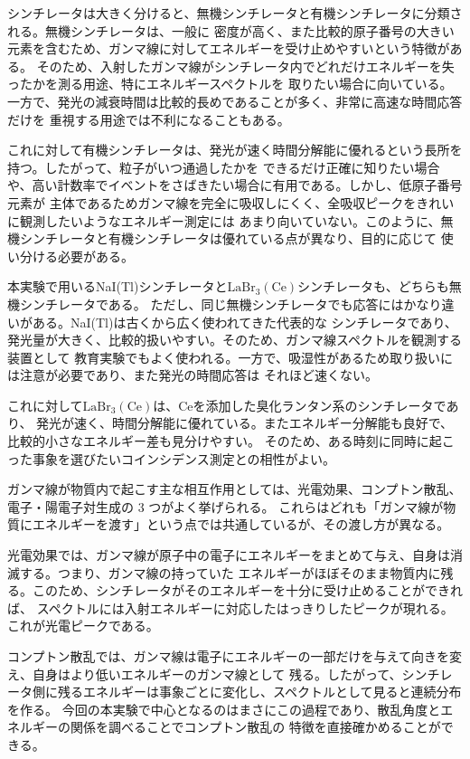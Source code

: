 \documentclass[uplatex,dvipdfmx,12pt,nomag]{jsarticle}
\begin{document}
シンチレータは大きく分けると、無機シンチレータと有機シンチレータに分類される。無機シンチレータは、一般に
密度が高く、また比較的原子番号の大きい元素を含むため、ガンマ線に対してエネルギーを受け止めやすいという特徴がある。
そのため、入射したガンマ線がシンチレータ内でどれだけエネルギーを失ったかを測る用途、特にエネルギースペクトルを
取りたい場合に向いている。一方で、発光の減衰時間は比較的長めであることが多く、非常に高速な時間応答だけを
重視する用途では不利になることもある。

これに対して有機シンチレータは、発光が速く時間分解能に優れるという長所を持つ。したがって、粒子がいつ通過したかを
できるだけ正確に知りたい場合や、高い計数率でイベントをさばきたい場合に有用である。しかし、低原子番号元素が
主体であるためガンマ線を完全に吸収しにくく、全吸収ピークをきれいに観測したいようなエネルギー測定には
あまり向いていない。このように、無機シンチレータと有機シンチレータは優れている点が異なり、目的に応じて
使い分ける必要がある。

本実験で用いるNaI(Tl)シンチレータと$\mathrm{LaBr}_{3}(\mathrm{Ce})$シンチレータも、どちらも無機シンチレータである。
ただし、同じ無機シンチレータでも応答にはかなり違いがある。NaI(Tl)は古くから広く使われてきた代表的な
シンチレータであり、発光量が大きく、比較的扱いやすい。そのため、ガンマ線スペクトルを観測する装置として
教育実験でもよく使われる。一方で、吸湿性があるため取り扱いには注意が必要であり、また発光の時間応答は
それほど速くない。

これに対して$\mathrm{LaBr}_{3}(\mathrm{Ce})$は、Ceを添加した臭化ランタン系のシンチレータであり、
発光が速く、時間分解能に優れている。またエネルギー分解能も良好で、比較的小さなエネルギー差も見分けやすい。
そのため、ある時刻に同時に起こった事象を選びたいコインシデンス測定との相性がよい。

ガンマ線が物質内で起こす主な相互作用としては、光電効果、コンプトン散乱、電子・陽電子対生成の 3 つがよく挙げられる。
これらはどれも「ガンマ線が物質にエネルギーを渡す」という点では共通しているが、その渡し方が異なる。

光電効果では、ガンマ線が原子中の電子にエネルギーをまとめて与え、自身は消滅する。つまり、ガンマ線の持っていた
エネルギーがほぼそのまま物質内に残る。このため、シンチレータがそのエネルギーを十分に受け止めることができれば、
スペクトルには入射エネルギーに対応したはっきりしたピークが現れる。これが光電ピークである。

コンプトン散乱では、ガンマ線は電子にエネルギーの一部だけを与えて向きを変え、自身はより低いエネルギーのガンマ線として
残る。したがって、シンチレータ側に残るエネルギーは事象ごとに変化し、スペクトルとして見ると連続分布を作る。
今回の本実験で中心となるのはまさにこの過程であり、散乱角度とエネルギーの関係を調べることでコンプトン散乱の
特徴を直接確かめることができる。
\end{document}
